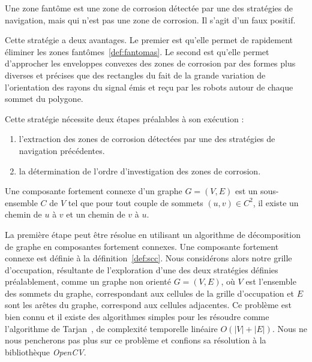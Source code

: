 \documentclass[francais,RandD]{rapportPFE}
\begin{document}
				\begin{Definition}
					\label{def:fantomas}
					Une zone fantôme est une zone de corrosion détectée par une des stratégies de navigation, mais qui n'est pas une zone de corrosion. Il s'agit d'un faux positif.
				\end{Definition}

				Cette stratégie a deux avantages.
				Le premier est qu'elle permet de rapidement éliminer les zones fantômes~\ref{def:fantomas}.
				Le second est qu'elle permet d'approcher les enveloppes convexes des zones de corrosion par des formes plus diverses et précises que des rectangles du fait de la grande variation de l'orientation des rayons du signal émis et reçu par les robots autour de chaque sommet du polygone.

				Cette stratégie nécessite deux étapes préalables à son exécution :
				\begin{enumerate}
					\item l'extraction des zones de corrosion détectées par une des stratégies de navigation précédentes.
					\item la détermination de l'ordre d'investigation des zones de corrosion.
				\end{enumerate}

				\begin{Definition}
					\label{def:scc}
					Une composante fortement connexe d'un graphe $G = (V, E)$ est un sous-ensemble $C$ de $V$ tel que pour tout couple de sommets $(u, v) \in C^2$, il existe un chemin de $u$ à $v$ et un chemin de $v$ à $u$.
				\end{Definition}

				La première étape peut être résolue en utilisant un algorithme de décomposition de graphe en composantes fortement connexes.
				Une composante fortement connexe est définie à la définition~\ref{def:scc}.
				Nous considérons alors notre grille d'occupation, résultante de l'exploration d'une des deux stratégies définies préalablement, comme un graphe non orienté $G = (V, E)$, où  $V$ est l'ensemble des sommets du graphe, correspondant aux cellules de la grille d'occupation et $E$ sont les arêtes du graphe, correspond aux cellules adjacentes.
				Ce problème est bien connu et il existe des algorithmes simples pour les résoudre comme l'algorithme de Tarjan~\cite{enwiki:1148118528}, de complexité temporelle linéaire $O(|V| + |E|)$.
				Nous ne nous pencherons pas plus sur ce problème et confions sa résolution à la bibliothèque \textit{OpenCV}.
\end{document}
